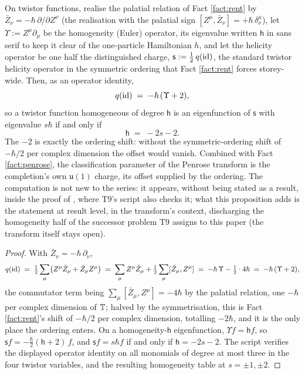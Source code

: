 \begin{proposition}\label{prop:homogeneity}
On twistor functions, realise the palatial relation of Fact \ref{fact:rent} by $\bar Z_\nu = -\hbar\,\partial/\partial Z^\nu$ (the realisation with the palatial sign $[Z^\mu, \bar Z_\nu] = +\hbar\,\delta^\mu_\nu$), let $\Upsilon := Z^\mu \partial_\mu$ be the homogeneity (Euler) operator, its eigenvalue written $\mathsf{h}$ in sans serif to keep it clear of the one-particle Hamiltonian $h$, and let the helicity operator be one half the distinguished charge, $\mathsf{s} := \tfrac12\, q(\mathrm{id})$, the standard twistor helicity operator \cite{Penrose1969, EPW1981} in the symmetric ordering that Fact \ref{fact:rent} forces storey-wide. Then, as an operator identity,
\[
q(\mathrm{id}) \;=\; -\hbar\,(\Upsilon + 2),
\]
so a twistor function homogeneous of degree $\mathsf{h}$ is an eigenfunction of $\mathsf{s}$ with eigenvalue $s\hbar$ if and only if
\[
\mathsf{h} \;=\; -2s - 2.
\]
The $-2$ is exactly the ordering shift: without the symmetric-ordering shift of $-\hbar/2$ per complex dimension the offset would vanish. Combined with Fact \ref{fact:penrose}, the classification parameter of the Penrose transform is the completion's own $\mathfrak{u}(1)$ charge, its offset supplied by the ordering. The computation is not new to the series: it appears, without being stated as a result, inside the proof of \cite[Thm.~5.7]{ButlerT9}, where T9's script also checks it; what this proposition adds is the statement at result level, in the transform's context, discharging the homogeneity half of the successor problem T9 assigns to this paper (the transform itself stays open).
\end{proposition}

\begin{proof}
With $\bar Z_\nu = -\hbar\,\partial_\nu$,
\[
q(\mathrm{id}) \;=\; \tfrac12\sum_\mu\bigl(Z^\mu \bar Z_\mu + \bar Z_\mu Z^\mu\bigr)
\;=\; \sum_\mu Z^\mu \bar Z_\mu + \tfrac12\sum_\mu [\bar Z_\mu, Z^\mu]
\;=\; -\hbar\,\Upsilon - \tfrac12\cdot 4\hbar \;=\; -\hbar\,(\Upsilon + 2),
\]
the commutator term being $\sum_\mu[\bar Z_\mu, Z^\mu] = -4\hbar$ by the palatial relation, one $-\hbar$ per complex dimension of $\mathbb{T}$; halved by the symmetrisation, this is Fact \ref{fact:rent}'s shift of $-\hbar/2$ per complex dimension, totalling $-2\hbar$, and it is the only place the ordering enters. On a homogeneity-$\mathsf{h}$ eigenfunction, $\Upsilon f = \mathsf{h} f$, so $\mathsf{s} f = -\tfrac{\hbar}{2}(\mathsf{h} + 2)\,f$, and $\mathsf{s} f = s\hbar f$ if and only if $\mathsf{h} = -2s - 2$. The script verifies the displayed operator identity on all monomials of degree at most three in the four twistor variables, and the resulting homogeneity table at $s = \pm 1, \pm 2$.
\end{proof}


